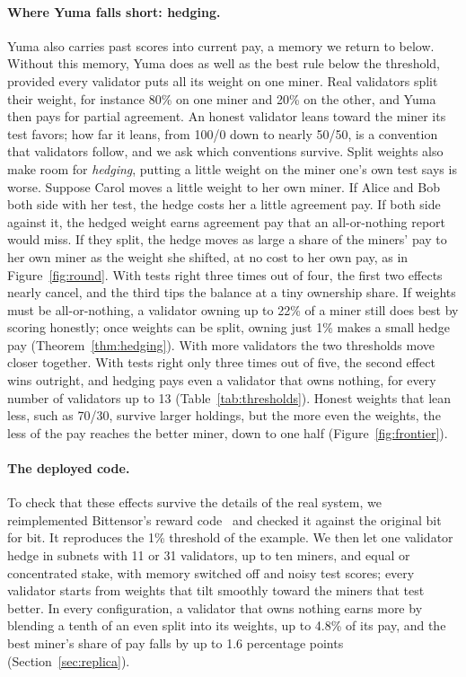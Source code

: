 \documentclass[sigconf,anonymous,review]{acmart}
\numberwithin{equation}{section}
\begin{document}
\paragraph{Where Yuma falls short: hedging.} Yuma also carries past scores into
current pay, a memory we return to below. Without this memory, Yuma does as
well as the best rule below the threshold, provided every validator puts all
its weight on one miner. Real validators split their weight, for instance 80\%
on one miner and 20\% on the other, and Yuma then pays for partial agreement.
An honest validator leans toward the miner its test favors; how far it leans,
from 100/0 down to nearly 50/50, is a convention that validators follow, and we
ask which conventions survive. Split weights also make room for
\emph{hedging}, putting a little weight on the miner one's own test says is
worse. Suppose Carol moves a little weight to her own miner. If Alice and Bob
both side with her test, the hedge costs her a little agreement pay. If both
side against it, the hedged weight earns agreement pay that an all-or-nothing
report would miss. If they split, the hedge moves as large a share of the
miners' pay to her own miner as the weight she shifted, at no cost to her own
pay, as in Figure~\ref{fig:round}. With tests right three times out of four,
the first two effects nearly cancel, and the third tips the balance at a tiny
ownership share. If weights must be all-or-nothing, a validator owning up to
22\% of a miner still does best by scoring honestly; once weights can be split,
owning just 1\% makes a small hedge pay (Theorem~\ref{thm:hedging}). With more
validators the two thresholds move closer together. With tests right only
three times out of five, the second effect wins outright, and hedging pays even
a validator that owns nothing, for every number of validators up to 13
(Table~\ref{tab:thresholds}). Honest weights that lean less, such as 70/30,
survive larger holdings, but the more even the weights, the less of the pay
reaches the better miner, down to one half (Figure~\ref{fig:frontier}).

\paragraph{The deployed code.} To check that these effects survive the details
of the real system, we reimplemented Bittensor's reward
code~\cite{subtensor2026} and checked it against the original bit for bit. It
reproduces the 1\% threshold of the example. We then let one validator hedge in subnets with 11 or 31 validators, up to ten
miners, and equal or concentrated stake, with memory switched off and noisy
test scores; every validator starts from weights that tilt smoothly toward the
miners that test better. In every configuration, a validator that owns nothing
earns more by blending a tenth of an even split into its weights, up to 4.8\%
of its pay, and the best miner's share of pay falls by up to 1.6 percentage
points (Section~\ref{sec:replica}).
\end{document}
